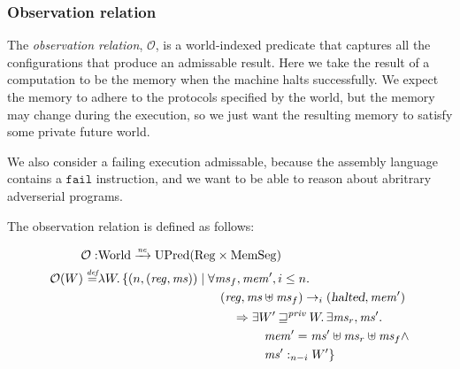 \documentclass[compsoc,conference,letterpaper,fleqn]{IEEEtran}
\newcommand{\nefun}{\xrightarrow{\textit{\tiny{ne}}}}
\newcommand{\defeq}{\stackrel{\textit{\tiny{def}}}{=}}
\newcommand{\var}[1]{\mathit{#1}}
\newcommand{\hs}{\var{ms}}
\newcommand{\ms}{\hs}
\newcommand{\reg}{\var{reg}}
\newcommand{\heap}{\var{mem}}
\newcommand{\halted}{\textsl{halted}}
\newcommand{\futurestr}{\mathbin{\sqsupseteq}^{\var{priv}}}
\newcommand{\heapSat}[3][\heap]{#1 :_{#2} #3}
\newcommand{\plaindom}[1]{\mathrm{#1}}
\newcommand{\Regs}{\plaindom{Reg}}
\newcommand{\HeapSegments}{\plaindom{MemSeg}}
\newcommand{\Worlds}{\plaindom{World}}
\newcommand{\UPred}[1]{\plaindom{UPred}(#1)}
\newcommand{\observations}{\mathcal{O}}
\newcommand{\npair}[2][n]{\left(#1,#2 \right)}
\newcommand{\zinstr}[1]{\mathtt{#1}}
\newcommand{\fail}{\zinstr{fail}}
\newcommand{\step}[1][]{\rightarrow_{#1}}
\begin{document}
\subsubsection{Observation relation}
  The
\emph{observation relation}, $\observations$, is a world-indexed
predicate that captures all the configurations that produce an
admissable result. Here we take the result of a computation to be the
memory when the machine halts successfully. We expect the memory to
adhere to the protocols specified by the world, but the memory may
change during the execution, so we just want the resulting memory to
satisfy some private future world.

We also consider a failing execution admissable, because the assembly
language contains a $\fail$ instruction, and we want to be able to
reason about abritrary adverserial programs.

The observation relation is defined as follows:

\begin{align*}
  \observations : &  \Worlds \nefun \UPred{\Regs \times \HeapSegments} \\
  \observations (W) \defeq & \lambda W \ldotp 
                             \{ \npair{(\reg,\ms)} \mid
                             \begin{aligned}[t]
                               & \forall \ms_f, \heap', i \leq n \ldotp \\
                               & \quad(\reg,\ms \uplus \ms_f) \step[i] (\halted,\heap')  \\
                               & \qquad \Rightarrow
                               \begin{aligned}[t]
                                 & \exists W' \futurestr W \ldotp\exists \ms_r, \ms' \ldotp\\
                                 & \quad \heap' = \ms' \uplus \ms_r \uplus \ms_f \land \\ 
                                 & \quad \heapSat[\hs']{n-i}{W'} \}
                               \end{aligned}
                             \end{aligned}
\end{align*}
\end{document}
